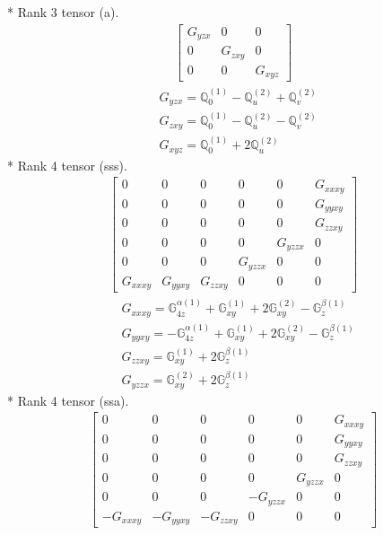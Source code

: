 \documentclass[fleqn,8pt,landscape]{jsarticle}
\begin{document}
* Rank 3 tensor (a).
\begin{align*}
\begin{bmatrix} G_{yzx} & 0 & 0 \\ 0 & G_{zxy} & 0 \\ 0 & 0 & G_{xyz} \end{bmatrix}
\end{align*}
\begin{align*}
& G_{yzx} = \mathbb{Q}_{0}^{(1)} - \mathbb{Q}_{u}^{(2)} + \mathbb{Q}_{v}^{(2)} \\
& G_{zxy} = \mathbb{Q}_{0}^{(1)} - \mathbb{Q}_{u}^{(2)} - \mathbb{Q}_{v}^{(2)} \\
& G_{xyz} = \mathbb{Q}_{0}^{(1)} + 2 \mathbb{Q}_{u}^{(2)}
\end{align*}
* Rank 4 tensor (sss).
\begin{align*}
\begin{bmatrix} 0 & 0 & 0 & 0 & 0 & G_{xxxy} \\ 0 & 0 & 0 & 0 & 0 & G_{yyxy} \\ 0 & 0 & 0 & 0 & 0 & G_{zzxy} \\ 0 & 0 & 0 & 0 & G_{yzzx} & 0 \\ 0 & 0 & 0 & G_{yzzx} & 0 & 0 \\ G_{xxxy} & G_{yyxy} & G_{zzxy} & 0 & 0 & 0 \end{bmatrix}
\end{align*}
\begin{align*}
& G_{xxxy} = \mathbb{G}_{4z}^{\alpha(1)} + \mathbb{G}_{xy}^{(1)} + 2 \mathbb{G}_{xy}^{(2)} - \mathbb{G}_{z}^{\beta(1)} \\
& G_{yyxy} = - \mathbb{G}_{4z}^{\alpha(1)} + \mathbb{G}_{xy}^{(1)} + 2 \mathbb{G}_{xy}^{(2)} - \mathbb{G}_{z}^{\beta(1)} \\
& G_{zzxy} = \mathbb{G}_{xy}^{(1)} + 2 \mathbb{G}_{z}^{\beta(1)} \\
& G_{yzzx} = \mathbb{G}_{xy}^{(2)} + 2 \mathbb{G}_{z}^{\beta(1)}
\end{align*}
* Rank 4 tensor (ssa).
\begin{align*}
\begin{bmatrix} 0 & 0 & 0 & 0 & 0 & G_{xxxy} \\ 0 & 0 & 0 & 0 & 0 & G_{yyxy} \\ 0 & 0 & 0 & 0 & 0 & G_{zzxy} \\ 0 & 0 & 0 & 0 & G_{yzzx} & 0 \\ 0 & 0 & 0 & - G_{yzzx} & 0 & 0 \\ - G_{xxxy} & - G_{yyxy} & - G_{zzxy} & 0 & 0 & 0 \end{bmatrix}
\end{align*}
\end{document}
